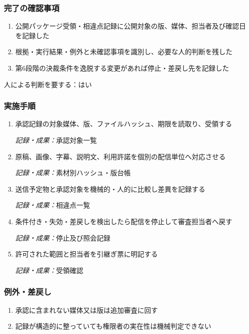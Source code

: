 \documentclass[a4paper,11pt]{article}
\begin{document}
\subsubsection*{完了の確認事項}
\begin{enumerate}[leftmargin=2em,itemsep=0.35em]
\item 公開パッケージ受領・相違点記録に公開対象の版、媒体、担当者及び確認日を記録した
\item 根拠・実行結果・例外と未確認事項を識別し、必要な人的判断を残した
\item 第6段階の決裁条件を逸脱する変更があれば停止・差戻し先を記録した
\end{enumerate}
\par 人による判断を要する：はい\par\medskip
\subsubsection*{実施手順}
\begin{enumerate}[leftmargin=2em,itemsep=0.65em]
\item 承認記録の対象媒体、版、ファイルハッシュ、期限を読取り、受領する\par\noindent\textit{記録・成果：}承認対象一覧\nobreak\smallskip
\item 原稿、画像、字幕、説明文、利用許諾を個別の配信単位へ対応させる\par\noindent\textit{記録・成果：}素材別ハッシュ・版台帳\nobreak\smallskip
\item 送信予定物と承認対象を機械的・人的に比較し差異を記録する\par\noindent\textit{記録・成果：}相違点一覧\nobreak\smallskip
\item 条件付き・失効・差戻しを検出したら配信を停止して審査担当者へ戻す\par\noindent\textit{記録・成果：}停止及び照会記録\nobreak\smallskip
\item 許可された範囲と担当者を引継ぎ票に明記する\par\noindent\textit{記録・成果：}受領確認\nobreak\smallskip
\end{enumerate}
\subsubsection*{例外・差戻し}
\begin{enumerate}[leftmargin=2em,itemsep=0.35em]
\item 承認に含まれない媒体又は版は追加審査に回す
\item 記録が構造的に整っていても権限者の実在性は機械判定できない
\end{enumerate}
\end{document}

